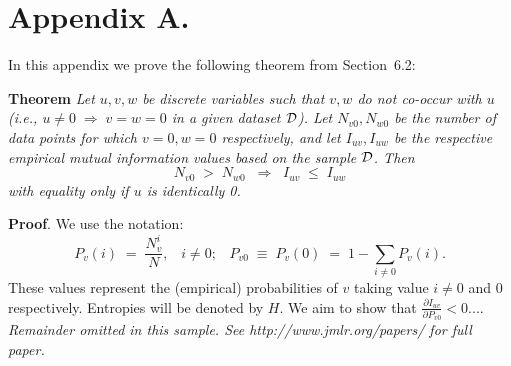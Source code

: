 \documentclass[twoside,11pt]{article}
\numberwithin{equation}{section}
\newcommand{\dataset}{{\cal D}}
\newcommand{\fracpartial}[2]{\frac{\partial #1}{\partial  #2}}
\begin{document}
\newpage

\appendix
\section*{Appendix A.}
\label{app:theorem}



In this appendix we prove the following theorem from
Section~6.2:

\noindent
{\bf Theorem} {\it Let $u,v,w$ be discrete variables such that $v, w$ do
not co-occur with $u$ (i.e., $u\neq0\;\Rightarrow \;v=w=0$ in a given
dataset $\dataset$). Let $N_{v0},N_{w0}$ be the number of data points for
which $v=0, w=0$ respectively, and let $I_{uv},I_{uw}$ be the
respective empirical mutual information values based on the sample
$\dataset$. Then
\[
	N_{v0} \;>\; N_{w0}\;\;\Rightarrow\;\;I_{uv} \;\leq\;I_{uw}
\]
with equality only if $u$ is identically 0.} \hfill\BlackBox

\noindent
{\bf Proof}. We use the notation:
\[
P_v(i) \;=\;\frac{N_v^i}{N},\;\;\;i \neq 0;\;\;\;
P_{v0}\;\equiv\;P_v(0)\; = \;1 - \sum_{i\neq 0}P_v(i).
\]
These values represent the (empirical) probabilities of $v$
taking value $i\neq 0$ and 0 respectively.  Entropies will be denoted
by $H$. We aim to show that $\fracpartial{I_{uv}}{P_{v0}} < 0$....\\

{\noindent \em Remainder omitted in this sample. See http://www.jmlr.org/papers/ for full paper.}


\vskip 0.2in

\end{document}
